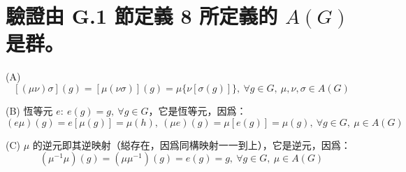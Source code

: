 \documentclass{article}
\begin{document}
\section{驗證由 G.1 節定義 8 所定義的 $A(G)$ 是群。}
\begin{framed}
  (A)
  $$
    [(\mu\nu)\sigma](g)=[\mu(\nu\sigma)](g)=\mu\{\nu[\sigma(g)]\},\ \forall g\in G,\ \mu,\nu,\sigma\in A(G)
  $$

  (B) 恆等元 $e:\ e(g)=g,\ \forall g\in G$，它是恆等元，因爲：
  $$
    (e\mu)(g)=e[\mu(g)]=\mu(h),\ (\mu e)(g)=\mu[e(g)]=\mu(g),\ \forall g\in G,\ \mu\in A(G)
  $$

  (C) $\mu$ 的逆元即其逆映射（縂存在，因爲同構映射一一到上），它是逆元，因爲：
  $$
    (\mu^{-1}\mu)(g)=(\mu\mu^{-1})(g)=e(g)=g,\ \forall g\in G,\ \mu\in A(G)
  $$
\end{framed}
\end{document}
